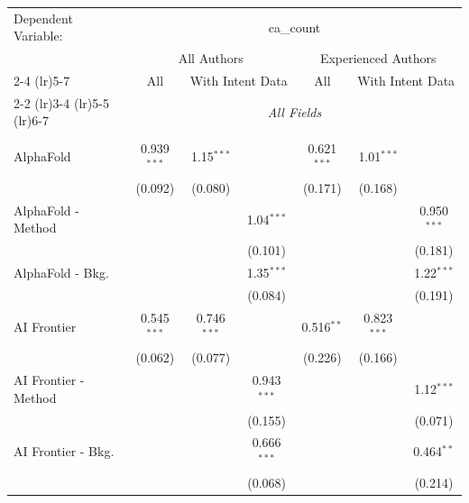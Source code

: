 \begingroup
\centering
\begin{tabular}{lcccccc}
   \tabularnewline \midrule \midrule
   Dependent Variable: & \multicolumn{6}{c}{ca\_count}\\
 & \multicolumn{3}{c}{All Authors} & \multicolumn{3}{c}{Experienced Authors} \\
\cmidrule(lr){2-4} \cmidrule(lr){5-7}
 & \multicolumn{1}{c}{All} & \multicolumn{2}{c}{With Intent Data} & \multicolumn{1}{c}{All} & \multicolumn{2}{c}{With Intent Data} \\
\cmidrule(lr){2-2} \cmidrule(lr){3-4} \cmidrule(lr){5-5} \cmidrule(lr){6-7}
 & \multicolumn{6}{c}{\textit{All Fields}} \\ \\
   AlphaFold            & 0.939$^{***}$ & 1.15$^{***}$  &               & 0.621$^{***}$ & 1.01$^{***}$  &   \\   
                        & (0.092)       & (0.080)       &               & (0.171)       & (0.168)       &   \\   
   AlphaFold - Method   &               &               & 1.04$^{***}$  &               &               & 0.950$^{***}$\\   
                        &               &               & (0.101)       &               &               & (0.181)\\   
   AlphaFold - Bkg.     &               &               & 1.35$^{***}$  &               &               & 1.22$^{***}$\\   
                        &               &               & (0.084)       &               &               & (0.191)\\   
   AI Frontier          & 0.545$^{***}$ & 0.746$^{***}$ &               & 0.516$^{**}$  & 0.823$^{***}$ &   \\   
                        & (0.062)       & (0.077)       &               & (0.226)       & (0.166)       &   \\   
   AI Frontier - Method &               &               & 0.943$^{***}$ &               &               & 1.12$^{***}$\\   
                        &               &               & (0.155)       &               &               & (0.071)\\   
   AI Frontier - Bkg.   &               &               & 0.666$^{***}$ &               &               & 0.464$^{**}$\\   
                        &               &               & (0.068)       &               &               & (0.214)\\   

\end{tabular}
